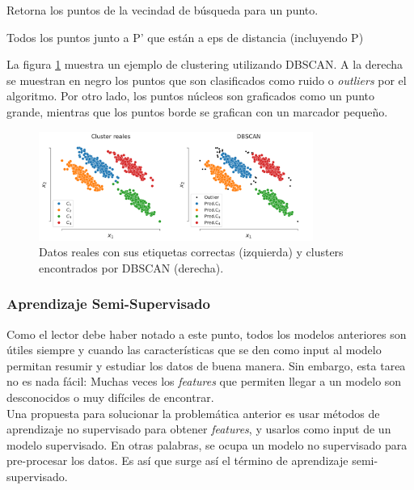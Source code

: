 \begin{algorithm}[H]
  \caption{Retorna los puntos de la vecindad de búsqueda para un punto.
    \label{alg:regionDeConsulta}}
  \begin{algorithmic}[1]
    
    \Return Todos los puntos junto a P' que están a eps de distancia (incluyendo P)
    \EndFunction
  \end{algorithmic}
\end{algorithm}

La figura \ref{fig:dbscan} muestra un ejemplo de clustering utilizando DBSCAN. A la derecha se muestran en negro los puntos que son clasificados como ruido o \emph{outliers} por el algoritmo. Por otro lado, los puntos núcleos son graficados como un punto grande, mientras que los puntos borde se grafican con un marcador pequeño.

\begin{figure}[H]
  \centering
  \includegraphics[width=0.8\textwidth]{img/cap6_dbscan}
  \caption{Datos reales con sus etiquetas correctas (izquierda) y clusters encontrados por DBSCAN (derecha).}
  \label{fig:dbscan}
\end{figure}

\subsubsection{Aprendizaje Semi-Supervisado}

Como el lector debe haber notado a este punto, todos los modelos anteriores son útiles siempre y cuando las características que se den como input al modelo permitan resumir y estudiar los datos de buena manera. Sin embargo, esta tarea no es nada fácil: Muchas veces los \textit{features} que permiten llegar a un modelo son desconocidos o muy difíciles de encontrar. \\

Una propuesta para solucionar la problemática anterior es usar métodos de aprendizaje no supervisado para obtener \textit{features}, y usarlos como input de un modelo supervisado. En otras palabras, se ocupa un modelo no supervisado para pre-procesar los datos. Es así que surge así el término de aprendizaje semi-supervisado. \\

